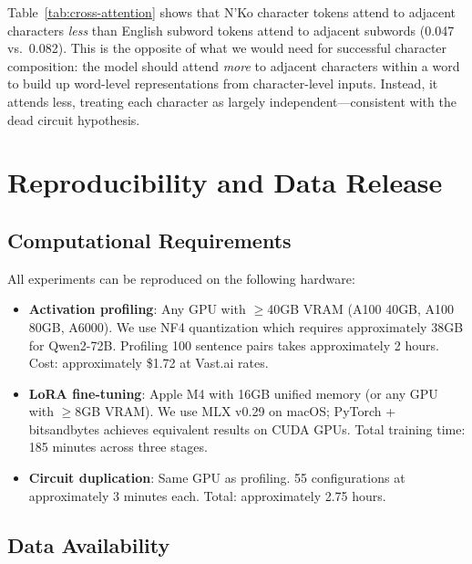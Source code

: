 \documentclass[11pt]{article}
\begin{document}
Table~\ref{tab:cross-attention} shows that N'Ko character tokens attend to adjacent characters \emph{less} than English subword tokens attend to adjacent subwords (0.047 vs.\ 0.082).
This is the opposite of what we would need for successful character composition: the model should attend \emph{more} to adjacent characters within a word to build up word-level representations from character-level inputs.
Instead, it attends less, treating each character as largely independent---consistent with the dead circuit hypothesis.

\section{Reproducibility and Data Release}

\subsection{Computational Requirements}

All experiments can be reproduced on the following hardware:
\begin{itemize}
\item \textbf{Activation profiling}: Any GPU with $\geq$40GB VRAM (A100 40GB, A100 80GB, A6000). We use NF4 quantization which requires approximately 38GB for Qwen2-72B. Profiling 100 sentence pairs takes approximately 2 hours. Cost: approximately \$1.72 at Vast.ai rates.
\item \textbf{LoRA fine-tuning}: Apple M4 with 16GB unified memory (or any GPU with $\geq$8GB VRAM). We use MLX v0.29 on macOS; PyTorch + bitsandbytes achieves equivalent results on CUDA GPUs. Total training time: 185 minutes across three stages.
\item \textbf{Circuit duplication}: Same GPU as profiling. 55 configurations at approximately 3 minutes each. Total: approximately 2.75 hours.
\end{itemize}

\subsection{Data Availability}
\end{document}
